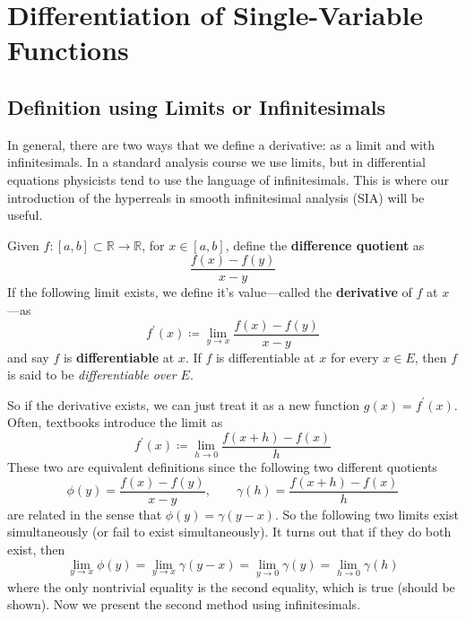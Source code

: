 \section{Differentiation of Single-Variable Functions} 

\subsection{Definition using Limits or Infinitesimals} 

  In general, there are two ways that we define a derivative: as a limit and with infinitesimals. In a standard analysis course we use limits, but in differential equations physicists tend to use the language of infinitesimals. This is where our introduction of the hyperreals in smooth infinitesimal analysis (SIA) will be useful. 

  \begin{definition}
    Given $f: [a, b] \subset \mathbb{R} \to \mathbb{R}$, for $x \in [a, b]$, define the \textbf{difference quotient} as 
    \begin{equation}
      \frac{f(x) - f(y)}{x - y}
    \end{equation}
    If the following limit exists, we define it's value---called the \textbf{derivative} of $f$ at $x$---as 
    \begin{equation}
      f^\prime (x) \coloneqq \lim_{y \to x} \frac{f(x) - f(y)}{x - y}
    \end{equation}
    and say $f$ is \textbf{differentiable} at $x$. If $f$ is differentiable at $x$ for every $x \in E$, then $f$ is said to be \textit{differentiable over $E$}. 
  \end{definition} 

  So if the derivative exists, we can just treat it as a new function $g(x) = f^\prime (x)$. Often, textbooks introduce the limit as 
  \begin{equation}
    f^\prime (x) \coloneqq \lim_{h \to 0} \frac{f(x + h) - f(x)}{h}
  \end{equation}
  These two are equivalent definitions since the following two different quotients 
  \begin{equation}
    \phi(y) = \frac{f(x) - f(y)}{x - y}, \qquad \gamma(h) = \frac{f(x + h) - f(x)}{h} 
  \end{equation}
  are related in the sense that $\phi(y) = \gamma(y - x)$. So the following two limits exist simultaneously (or fail to exist simultaneously). It turns out that if they do both exist, then 
  \begin{equation}
    \lim_{y \to x} \phi(y) = \lim_{y \to x} \gamma(y - x) = \lim_{y \to 0} \gamma(y) = \lim_{h \to 0} \gamma(h)
  \end{equation}
  where the only nontrivial equality is the second equality, which is true (should be shown). Now we present the second method using infinitesimals. 

